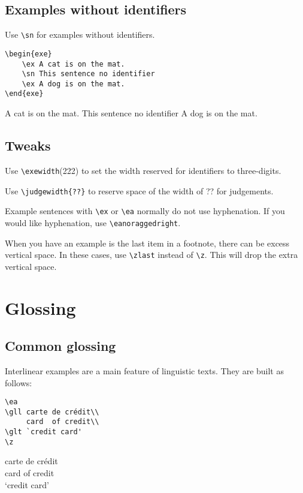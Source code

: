 \documentclass[output=guidelines]{langscibook}
\newcommand{\cmd}[1]{\texttt{\textbackslash#1}}
\begin{document}
\subsection{Examples without identifiers}
Use \cmd{sn} for examples without identifiers.

\begin{minipage}{.55\textwidth}
\begin{lstlisting}
\begin{exe}
    \ex A cat is on the mat. 
    \sn This sentence no identifier
    \ex A dog is on the mat. 
\end{exe}
 \end{lstlisting}
\end{minipage}
\parbox{.45\textwidth}{
\begin{exe}
    \ex A cat is on the mat. 
    \sn This sentence no identifier
    \ex A dog is on the mat. 
\end{exe}
}

\subsection{Tweaks}
Use \cmd{exewidth}{(222)} to set the width reserved for identifiers to three-digits. 

Use \cmd{judgewidth\{??\}} to reserve space of the width of ?? for judgements. 

Example sentences with \cmd{ex} or \cmd{ea} normally do not use hyphenation. If you would like hyphenation, use \cmd{eanoraggedright}.

When you have an example is the last item in a footnote, there can be excess vertical space. In these cases, use \cmd{zlast} instead of \cmd{z}. This will drop the extra vertical space.

 
\section{Glossing}
\subsection{Common glossing}
Interlinear examples are a main feature of linguistic texts. They are built as follows: 

\begin{minipage}{.55\textwidth}
\begin{lstlisting}
\ea
\gll carte de crédit\\
     card  of credit\\
\glt `credit card'     
\z
 \end{lstlisting}
\end{minipage}
\parbox{.45\textwidth}{ 
\ea
\gll carte de crédit\\
     card  of credit\\
\glt `credit card'     
\z 
}
\end{document}
